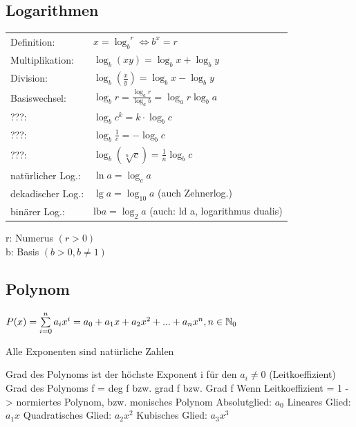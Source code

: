 	\begin{emphbox}
%			
	\end{emphbox}
	
\subsection{Logarithmen}

	\begin{emphbox}
		\begin{tabular}{ll}
		Definition: & $ x = {\log_{b}}^r \Leftrightarrow b^x = r $\\
		Multiplikation: & $ \log_b (xy) = \log_b x + \log_b y $ \\
		Division: & $ \log_b (\frac{x}{y}) = \log_b x - \log_b y $ \\
		Basiswechsel: & $ \log_b r = \frac{\log_a r}{\log_a b} = \log_a r \log_b a$ \\
		???: & $ \log_b c^k = k \cdot \log_b c $ \\
		???: & $ \log_b \frac{1}{c} = - \log_b c $ \\
		???: & $ \log_b(\sqrt[n]{c}) = \frac{1}{n} \log_b c $ \\
		natürlicher Log.: & $ \ln a = \log_e a $ \\
		dekadischer Log.: & $ \lg a = \log_{10} a $ (auch Zehnerlog.) \\
		binärer Log.: & $ \text{lb} a = \log_{2} a $ (auch: ld a, logarithmus dualis)
		\end{tabular}
	\end{emphbox}
	r: Numerus $(r > 0)$ \\
	b: Basis $(b > 0, b \neq 1)$
	
\subsection{Polynom}

	\begin{emphbox}
	
		$ P(x) = \sum\limits _{i=0}^{n}a_ix^i = a_0 + a_1 x + a_2 x^2 + ... + a_n x^n, n \in \operatorname{\mathbb N}_0 $ \\
	\end{emphbox}

	Alle Exponenten sind natürliche Zahlen

	Grad des Polynoms ist der höchste Exponent i für den $ a_i \neq 0 $ (Leitkoeffizient)
	Grad des Polynoms f = deg f bzw. grad f bzw. Grad f
	Wenn Leitkoeffizient = 1 -> normiertes Polynom, bzw. monisches Polynom
	Absolutglied: $ a_0 $
	Lineares Glied: $a_1x$
	Quadratisches Glied: $a_2x^2$
	Kubisches Glied: $a_3x^3$

